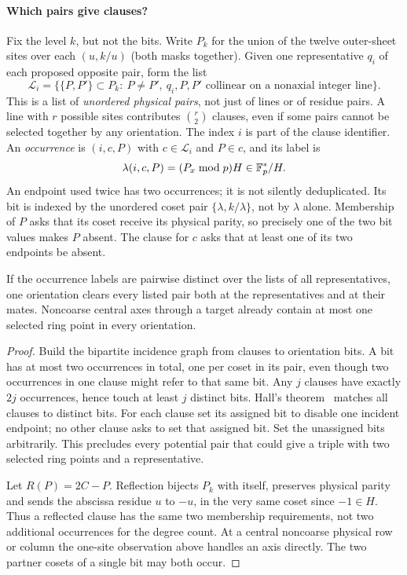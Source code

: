 \paragraph{Which pairs give clauses?} Fix the level $k$, but not the bits. Write $P_k$ for the union of the twelve outer-sheet sites over each $(u,k/u)$ (both masks together). Given one representative $q_i$ of each proposed opposite pair, form the list
\[
 \mathcal L_i=\big\{\{P,P'\}\subset P_k:\ P\ne P',\ q_i,P,P'\text{ collinear on a nonaxial integer line}\big\}.
\]
This is a list of \emph{unordered physical pairs}, not just of lines or of residue pairs. A line with $r$ possible sites contributes $\binom r2$ clauses, even if some pairs cannot be selected together by any orientation. The index $i$ is part of the clause identifier. An \emph{occurrence} is $(i,c,P)$ with $c\in\mathcal L_i$ and $P\in c$, and its label is
\[
 \lambda(i,c,P)=(P_x\bmod p)H\in\mathbb F_p^*/H.
\]
An endpoint used twice has two occurrences; it is not silently deduplicated. Its bit is indexed by the unordered coset pair $\{\lambda,k/\lambda\}$, not by $\lambda$ alone. Membership of $P$ asks that its coset receive its physical parity, so precisely one of the two bit values makes $P$ absent. The clause for $c$ asks that at least one of its two endpoints be absent.

\begin{lemma}\label{lem:matching}
If the occurrence labels are pairwise distinct over the lists of all representatives, one orientation clears every listed pair both at the representatives and at their mates. Noncoarse central axes through a target already contain at most one selected ring point in every orientation.
\end{lemma}
\begin{proof}
Build the bipartite incidence graph from clauses to orientation bits. A bit has at most two occurrences in total, one per coset in its pair, even though two occurrences in one clause might refer to that same bit. Any $j$ clauses have exactly $2j$ occurrences, hence touch at least $j$ distinct bits. Hall's theorem~\cite{marriage} matches all clauses to distinct bits. For each clause set its assigned bit to disable one incident endpoint; no other clause asks to set that assigned bit. Set the unassigned bits arbitrarily. This precludes every potential pair that could give a triple with two selected ring points and a representative.

Let $R(P)=2C-P$. Reflection bijects $P_k$ with itself, preserves physical parity and sends the abscissa residue $u$ to $-u$, in the very same coset since $-1\in H$. Thus a reflected clause has the same two membership requirements, not two additional occurrences for the degree count. At a central noncoarse physical row or column the one-site observation above handles an axis directly. The two partner cosets of a single bit may both occur.
\end{proof}

